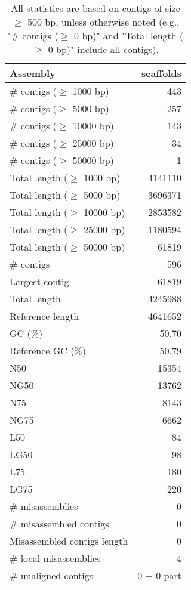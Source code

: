 \documentclass[12pt,a4paper]{article}
\begin{document}
\begin{table}[ht]
\begin{center}
\caption{All statistics are based on contigs of size $\geq$ 500 bp, unless otherwise noted (e.g., "\# contigs ($\geq$ 0 bp)" and "Total length ($\geq$ 0 bp)" include all contigs).}
\begin{tabular}{|l*{1}{|r}|}
\hline
Assembly & scaffolds \\ \hline
\# contigs ($\geq$ 1000 bp) & 443 \\ \hline
\# contigs ($\geq$ 5000 bp) & 257 \\ \hline
\# contigs ($\geq$ 10000 bp) & 143 \\ \hline
\# contigs ($\geq$ 25000 bp) & 34 \\ \hline
\# contigs ($\geq$ 50000 bp) & 1 \\ \hline
Total length ($\geq$ 1000 bp) & 4141110 \\ \hline
Total length ($\geq$ 5000 bp) & 3696371 \\ \hline
Total length ($\geq$ 10000 bp) & 2853582 \\ \hline
Total length ($\geq$ 25000 bp) & 1180594 \\ \hline
Total length ($\geq$ 50000 bp) & 61819 \\ \hline
\# contigs & 596 \\ \hline
Largest contig & 61819 \\ \hline
Total length & 4245988 \\ \hline
Reference length & 4641652 \\ \hline
GC (\%) & 50.70 \\ \hline
Reference GC (\%) & 50.79 \\ \hline
N50 & 15354 \\ \hline
NG50 & 13762 \\ \hline
N75 & 8143 \\ \hline
NG75 & 6662 \\ \hline
L50 & 84 \\ \hline
LG50 & 98 \\ \hline
L75 & 180 \\ \hline
LG75 & 220 \\ \hline
\# misassemblies & 0 \\ \hline
\# misassembled contigs & 0 \\ \hline
Misassembled contigs length & 0 \\ \hline
\# local misassemblies & 4 \\ \hline
\# unaligned contigs & 0 + 0 part \\ \hline

\end{tabular}
\end{center}
\end{table}
\end{document}
